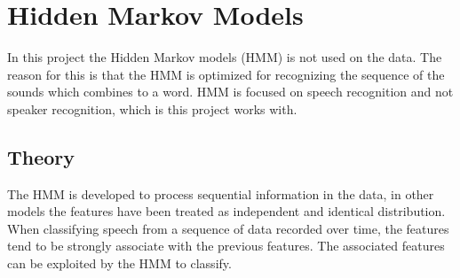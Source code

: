 \chapter{Hidden Markov Models}
In this project the Hidden Markov models (HMM) is not used on the data.
The reason for this is that the HMM is optimized for recognizing the sequence of the sounds which combines to a word.
HMM is focused on speech recognition and not speaker recognition, which is this project works with.

\section{Theory}   
The HMM is developed to process sequential information in the data, in other models the features have been treated as independent and identical distribution.
When classifying speech from a sequence of data recorded over time, the features tend to be strongly associate with the previous features.
The associated features can be exploited by the HMM to classify.          